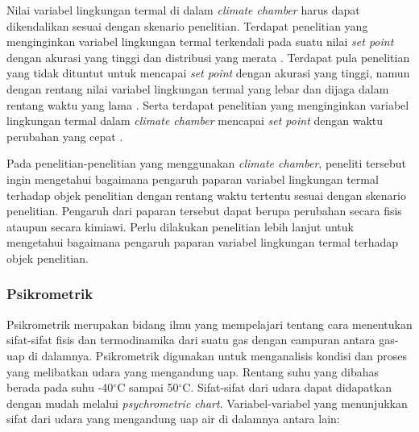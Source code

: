 Nilai variabel lingkungan termal di dalam \textit{climate chamber} harus dapat dikendalikan sesuai dengan skenario penelitian. Terdapat penelitian yang menginginkan variabel lingkungan termal terkendali pada suatu nilai \textit{set point} dengan akurasi yang tinggi dan distribusi yang merata \cite{paper31WHe}. Terdapat pula penelitian yang tidak dituntut untuk mencapai \textit{set point} dengan akurasi yang tinggi, namun dengan rentang nilai variabel lingkungan termal yang lebar dan dijaga dalam rentang waktu yang lama \cite{paper31APLeskinen, paper31AHuguet, paper31EJofre, paper31Srinivasa}. Serta terdapat penelitian yang menginginkan variabel lingkungan termal dalam \textit{climate chamber} mencapai \textit{set point} dengan waktu perubahan yang cepat \cite{paper31Emartinez}.

Pada penelitian-penelitian yang menggunakan \textit{climate chamber}, peneliti tersebut ingin mengetahui bagaimana pengaruh paparan variabel lingkungan termal terhadap objek penelitian dengan rentang waktu tertentu sesuai dengan skenario penelitian.
Pengaruh dari paparan tersebut dapat berupa perubahan secara fisis ataupun secara kimiawi. Perlu dilakukan penelitian lebih lanjut untuk mengetahui bagaimana pengaruh paparan variabel lingkungan termal terhadap objek penelitian.

\subsubsection{Psikrometrik}

Psikrometrik merupakan bidang ilmu yang mempelajari tentang cara menentukan sifat-sifat fisis dan termodinamika dari suatu gas dengan campuran antara gas-uap di dalamnya. Psikrometrik digunakan untuk menganalisis kondisi dan proses yang melibatkan udara yang mengandung uap. Rentang suhu yang dibahas berada pada suhu -40$^\circ$C sampai 50$^\circ$C. Sifat-sifat dari udara dapat didapatkan dengan mudah melalui \textit{psychrometric chart}. Variabel-variabel yang menunjukkan sifat dari udara yang mengandung uap air di dalamnya antara lain: \cite{skripsiIchfan}

